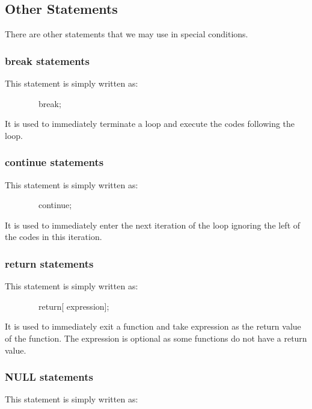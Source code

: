 \documentclass[12pt,psfig,a4]{article}
\begin{document}
\subsection{Other Statements}
There are other statements that we may use in special conditions.

\subsubsection{break statements}
This statement is simply written as:

\begin{code}
\begin{tabbing}
~~~~~~~~break;
\end{tabbing}
\end{code}

It is used to immediately terminate a loop and execute the codes following the loop.

\subsubsection{continue statements}
This statement is simply written as:

\begin{code}
\begin{tabbing}
~~~~~~~~continue;
\end{tabbing}
\end{code}

It is used to immediately enter the next iteration of the loop ignoring the left of the codes in this iteration.

\subsubsection{return statements}
This statement is simply written as:

\begin{code}
\begin{tabbing}
~~~~~~~~return[ expression];
\end{tabbing}
\end{code}

It is used to immediately exit a function and take expression as the return value of the function. The expression is optional as some functions do not have a return value.

\subsubsection{NULL statements}
This statement is simply written as:
\end{document}
